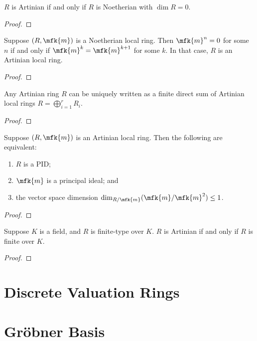 \begin{theorem}
    \(R\) is Artinian if and only if \(R\) is Noetherian with \(\dim R = 0\).
\end{theorem}
\begin{proof}
    
\end{proof}

\begin{proposition}
    Suppose \((R,\mfk{m})\) is a Noetherian local ring.
    Then \(\mfk{m}^n = 0\) for some \(n\) if and only if \(\mfk{m}^k = \mfk{m}^{k+1}\) for some \(k\).
    In that case, \(R\) is an Artinian local ring.
\end{proposition}
\begin{proof}
    
\end{proof}

\begin{theorem}
    Any Artinian ring \(R\) can be uniquely written as
    a finite direct sum of Artinian local rings \(R = \bigoplus_{i=1}^r R_i\).
\end{theorem}
\begin{proof}
    
\end{proof}

\begin{proposition}
    Suppose \((R,\mfk{m})\) is an Artinian local ring.
    Then the following are equivalent:
    \begin{enumerate}[label={(\roman*)}, itemsep=0mm]
        \item \(R\) is a PID;
        \item \(\mfk{m}\) is a principal ideal; and
        \item the vector space dimension \(\dim_{R/\mfk{m}}(\mfk{m}/\mfk{m}^2) \leq 1\).
    \end{enumerate}
\end{proposition}
\begin{proof}
    
\end{proof}

\begin{proposition}
    Suppose \(K\) is a field, and \(R\) is finite-type over \(K\).
    \(R\) is Artinian if and only if \(R\) is finite over \(K\).
\end{proposition}
\begin{proof}
    
\end{proof}


\section{Discrete Valuation Rings}


\section{Gr\"obner Basis}
